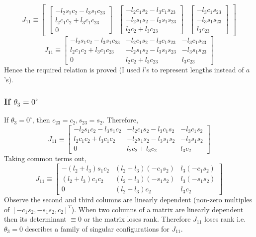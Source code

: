 \documentclass[12pt]{article}
\begin{document}
\[
  J_{11} \equiv
  \begin{bmatrix}
    \begin{bmatrix}
      -l_2s_1c_2 - l_3s_1c_{23} \\
      l_2c_1c_2 + l_3c_1c_{23} \\
      0
    \end{bmatrix}
    &
    \begin{bmatrix}
      -l_2c_1s_2 - l_3c_1s_{23} \\
      -l_2s_1s_2 - l_3s_1s_{23} \\
      l_2c_2 + l_3c_{23}
    \end{bmatrix}
    &
    \begin{bmatrix}
      -l_3c_1s_{23}\\
      -l_3s_1s_{23}\\
      l_3c_{23}
    \end{bmatrix}
  \end{bmatrix}
\]
\[
  J_{11} \equiv
    \begin{bmatrix}
      -l_2s_1c_2 - l_3s_1c_{23} & -l_2c_1s_2 - l_3c_1s_{23} & -l_3c_1s_{23}\\
      l_2c_1c_2 + l_3c_1c_{23}  & -l_2s_1s_2 - l_3s_1s_{23} & -l_3s_1s_{23}\\
      0                         & l_2c_2 + l_3c_{23}        & l_3c_{23}
    \end{bmatrix}
\]
Hence the required relation is proved (I used $l$'s to represent lengths instead of $a$'s).

\subsubsection*{If $\theta_3 = 0^{\circ}$}
If $\theta_3 = 0^{\circ}$, then $c_{23} = c_2, s_{23} = s_2$. Therefore,
\[
  J_{11} \equiv
    \begin{bmatrix}
      -l_2s_1c_2 - l_3s_1c_{2} & -l_2c_1s_2 - l_3c_1s_{2} & -l_3c_1s_{2}\\
      l_2c_1c_2 + l_3c_1c_{2}  & -l_2s_1s_2 - l_3s_1s_{2} & -l_3s_1s_{2}\\
      0                         & l_2c_2 + l_3c_{2}        & l_3c_{2}
    \end{bmatrix}
\]
Taking common terms out,
\[
  J_{11} \equiv
    \begin{bmatrix}
      -(l_2 + l_3)s_1c_2 & (l_2 + l_3)(-c_1s_2) & l_3(-c_1s_{2})\\
      (l_2 + l_3)c_1c_2  & (l_2 + l_3)(-s_1s_2) & l_3(-s_1s_{2})\\
      0                  & (l_2 + l_3)c_2        & l_3c_{2}
    \end{bmatrix}
\]
Observe the second and third columns are linearly dependent (non-zero multiples of $[-c_1s_2, -s_1s_2, c_2]^T$). When two columns of a matrix are linearly dependent then its determinant $\equiv 0$ or the matrix loses rank. Therefore $J_{11}$ loses rank i.e. $\theta_3 = 0$ describes a family of singular configurations for $J_{11}$.
\end{document}
